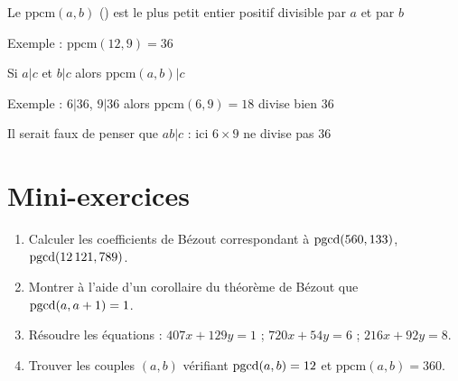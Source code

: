 \begin{frame}


\begin{mydefinition}
Le $\text{ppcm}(a,b)$ () 
est le plus petit entier positif divisible par $a$ et par $b$
\end{mydefinition}

\pause

Exemple : $\text{ppcm}(12,9)=36$

\pause

\begin{proposition}
\end{proposition}

\pause

\begin{proposition}
Si $a|c$ et $b|c$ alors $\text{ppcm}(a,b)|c$
\end{proposition}

\pause

Exemple : $6|36$, $9|36$ alors $\text{ppcm}(6,9)=18$ divise bien $36$

\pause

Il serait faux de penser que $ab|c$ : ici $6\times 9$ ne divise pas $36$


\end{frame}




\section*{Mini-exercices}

\begin{frame}
\begin{miniexercice}
\begin{enumerate}
  \item Calculer les coefficients de Bézout correspondant à $\mathop{\text{pgcd}}\nolimits(560,133)$, $\mathop{\text{pgcd}}\nolimits(12\,121,789)$.
  \item Montrer à l'aide d'un corollaire du théorème de Bézout que $\mathop{\text{pgcd}}\nolimits(a,a+1)=1$.
  \item Résoudre les équations : $407x+129y=1$ ; $720x+54y=6$ ; $216x+92y=8$.
  \item Trouver les couples $(a,b)$ vérifiant $\mathop{\text{pgcd}}\nolimits(a,b)=12$ et $\text{ppcm}(a,b)=360$.
\end{enumerate}  
\end{miniexercice}
\end{frame}


